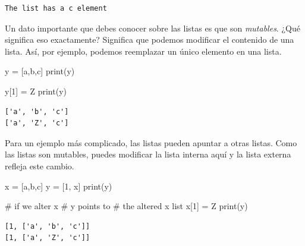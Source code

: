 \documentclass[
  letterpaper,
]{scrbook}
\newenvironment{Shaded}{\begin{snugshade}}{\end{snugshade}}
\newcommand{\BuiltInTok}[1]{\textcolor[rgb]{0.00,0.23,0.31}{#1}}
\newcommand{\CommentTok}[1]{\textcolor[rgb]{0.37,0.37,0.37}{#1}}
\newcommand{\DecValTok}[1]{\textcolor[rgb]{0.68,0.00,0.00}{#1}}
\newcommand{\NormalTok}[1]{\textcolor[rgb]{0.00,0.23,0.31}{#1}}
\newcommand{\OperatorTok}[1]{\textcolor[rgb]{0.37,0.37,0.37}{#1}}
\newcommand{\StringTok}[1]{\textcolor[rgb]{0.13,0.47,0.30}{#1}}
\begin{document}
\begin{verbatim}
The list has a c element
\end{verbatim}

Un dato importante que debes conocer sobre las listas es que son
\emph{mutables}. ¿Qué significa eso exactamente? Significa que podemos
modificar el contenido de una lista. Así, por ejemplo, podemos
reemplazar un único elemento en una lista.

\begin{Shaded}
\begin{Highlighting}[]
\NormalTok{y }\OperatorTok{=}\NormalTok{ [}\StringTok{\textquotesingle{}a\textquotesingle{}}\NormalTok{,}\StringTok{\textquotesingle{}b\textquotesingle{}}\NormalTok{,}\StringTok{\textquotesingle{}c\textquotesingle{}}\NormalTok{]}
\BuiltInTok{print}\NormalTok{(y)}

\NormalTok{y[}\DecValTok{1}\NormalTok{] }\OperatorTok{=} \StringTok{\textquotesingle{}Z\textquotesingle{}}
\BuiltInTok{print}\NormalTok{(y)}
\end{Highlighting}
\end{Shaded}

\begin{verbatim}
['a', 'b', 'c']
['a', 'Z', 'c']
\end{verbatim}

Para un ejemplo más complicado, las listas pueden apuntar a otras
listas. Como las listas son mutables, puedes modificar la lista interna
aquí y la lista externa refleja este cambio.

\begin{Shaded}
\begin{Highlighting}[]
\NormalTok{x }\OperatorTok{=}\NormalTok{ [}\StringTok{\textquotesingle{}a\textquotesingle{}}\NormalTok{,}\StringTok{\textquotesingle{}b\textquotesingle{}}\NormalTok{,}\StringTok{\textquotesingle{}c\textquotesingle{}}\NormalTok{]}
\NormalTok{y }\OperatorTok{=}\NormalTok{ [}\DecValTok{1}\NormalTok{, x]}
\BuiltInTok{print}\NormalTok{(y)}

\CommentTok{\# if we alter x}
\CommentTok{\# y points to }
\CommentTok{\# the altered x list}
\NormalTok{x[}\DecValTok{1}\NormalTok{] }\OperatorTok{=} \StringTok{\textquotesingle{}Z\textquotesingle{}}
\BuiltInTok{print}\NormalTok{(y)}
\end{Highlighting}
\end{Shaded}

\begin{verbatim}
[1, ['a', 'b', 'c']]
[1, ['a', 'Z', 'c']]
\end{verbatim}
\end{document}
